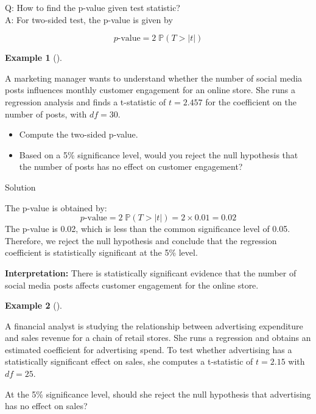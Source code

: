 \documentclass[
  12pt,
  letterpaper,
]{scrbook}
\providecommand{\tightlist}{%
  \setlength{\itemsep}{0pt}\setlength{\parskip}{0pt}}
\renewcommand{\tightlist}{\setlength{\itemsep}{0.5\baselineskip}\setlength{\parskip}{0.2\baselineskip}}
\renewcommand{\P}{\mathbb{P}}
\theoremstyle{plain}
\theoremstyle{definition}
\newtheorem{example}{Example}[chapter]
\theoremstyle{remark}
\begin{document}
Q: How to find the p-value given test statistic?\\
A: For two-sided test, the p-value is given by

\[
p\text{-value} = 2\;\P(T > |t|)
\]

\begin{example}[]\protect\hypertarget{exm-1}{}\label{exm-1}

A marketing manager wants to understand whether the number of social
media posts influences monthly customer engagement for an online store.
She runs a regression analysis and finds a t-statistic of \(t = 2.457\)
for the coefficient on the number of posts, with \(df = 30\).

\begin{itemize}
\tightlist
\item
  Compute the two-sided p-value.
\item
  Based on a 5\% significance level, would you reject the null
  hypothesis that the number of posts has no effect on customer
  engagement?
\end{itemize}

\end{example}

Solution

\label{solution1}
The p-value is obtained by:
\[p\text{-value} = 2\;\P(T > |t|) = 2 \times 0.01 = 0.02\] The p-value
is 0.02, which is less than the common significance level of 0.05.
Therefore, we reject the null hypothesis and conclude that the
regression coefficient is statistically significant at the 5\% level.

\textbf{Interpretation:} There is statistically significant evidence
that the number of social media posts affects customer engagement for
the online store.

\begin{example}[]\protect\hypertarget{exm-2}{}\label{exm-2}

A financial analyst is studying the relationship between advertising
expenditure and sales revenue for a chain of retail stores. She runs a
regression and obtains an estimated coefficient for advertising spend.
To test whether advertising has a statistically significant effect on
sales, she computes a t-statistic of \(t = 2.15\) with \(df = 25\).

At the 5\% significance level, should she reject the null hypothesis
that advertising has no effect on sales?

\end{example}
\end{document}
